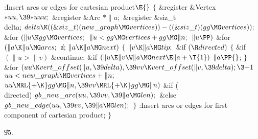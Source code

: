 \B{}:Insert arcs or edges for cartesian product\X${}\E{}$\6
${}\{{}$\5
\1\&{register} \&{Vertex} ${}{*}\\{uu},\39{*}\\{uuu};{}$\6
\&{register} \&{Arc} ${}{*}\|a;{}$\6
\&{register} \&{siz\_t} \\{delta};\7
${}\\{delta}\K((\&{siz\_t})(\\{new\_graph}\MG\\{vertices}))-((\&{siz\_t})(%
\\{gg}\MG\\{vertices}));{}$\6
\&{for} ${}(\|u\K\\{gg}\MG\\{vertices};{}$ ${}\|u<\\{gg}\MG\\{vertices}+\\{gg}%
\MG\|n;{}$ ${}\|u\PP){}$\1\6
\&{for} ${}(\|a\K\|u\MG\\{arcs};{}$ \|a; ${}\|a\K\|a\MG\\{next}){}$\5
${}\{{}$\1\6
${}\|v\K\|a\MG\\{tip};{}$\6
\&{if} ${}(\R\\{directed}){}$\5
${}\{{}$\1\6
\&{if} ${}(\|u>\|v){}$\1\5
\&{continue};\2\6
\&{if} ${}(\|u\E\|v\W\|a\MG\\{next}\E\|a+\T{1}){}$\1\5
${}\|a\PP{}$;\2\6
\4${}\}{}$\2\6
\&{for} ${}(\\{uu}\K\\{vert\_offset}(\|u,\39\\{delta}),\39\\{vv}\K\\{vert%
\_offset}(\|v,\39\\{delta});\3{-1}{}$ ${}\\{uu}<\\{new\_graph}\MG\\{vertices}+%
\|n;{}$ ${}\\{uu}\MRL{+{\K}}\\{gg}\MG\|n,\39\\{vv}\MRL{+{\K}}\\{gg}\MG\|n){}$\1%
\6
\&{if} (\\{directed})\1\5
${}\\{gb\_new\_arc}(\\{uu},\39\\{vv},\39\|a\MG\\{len});{}$\2\6
\&{else}\1\5
${}\\{gb\_new\_edge}(\\{uu},\39\\{vv},\39\|a\MG\\{len});{}$\2\2\6
\4${}\}{}$\2\2\6
:Insert arcs or edges for first component of cartesian product\X;\6
\4${}\}{}$\2\par
\U95.\fi

